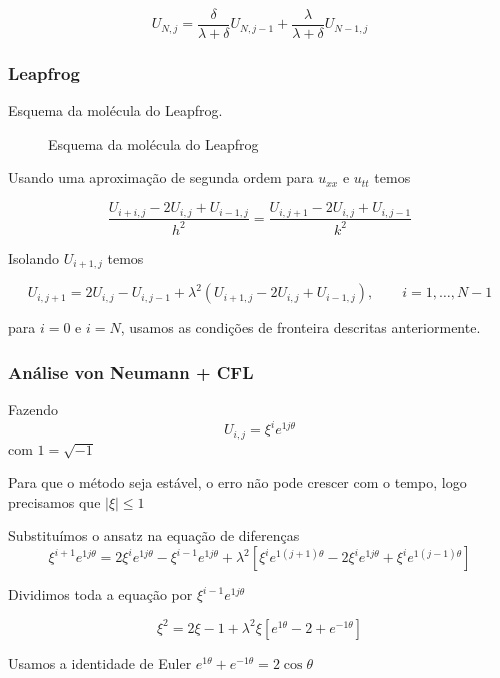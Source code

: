 \documentclass[11pt]{article}
\begin{document}
\[U_{N,j} = \frac{\delta}{\lambda + \delta}U_{N,{j-1}} +\frac{\lambda}{\lambda + \delta} U_{N-1,j}\]

    \hypertarget{leapfrog}{%
\subsubsection{Leapfrog 🐸}\label{leapfrog}}

    Esquema da molécula do Leapfrog.

\begin{figure}
\centering
\caption{Esquema da molécula do Leapfrog}
\end{figure}

    Usando uma aproximação de segunda ordem para \(u_{xx}\) e \(u_{tt}\)
temos

\[
\frac{
  U_{i+i,j} - 2U_{i,j} + U_{i-1,j}
}{h^2} =
\frac{
  U_{i,j+1} - 2U_{i,j} + U_{i,j-1}
}{k^2}
\]

Isolando \(U_{i+1,j}\) temos

\[
U_{i,j+1} = 2U_{i,j} - U_{i,j-1} + \lambda^2\left(U_{i+1,j} - 2U_{i,j} + U_{i-1,j}\right), \qquad i=1,\ldots,N-1
\]

para \(i=0\) e \(i=N\), usamos as condições de fronteira descritas
anteriormente.

    \hypertarget{anuxe1lise-von-neumann-cfl}{%
\subsubsection{Análise von Neumann +
CFL}\label{anuxe1lise-von-neumann-cfl}}

Fazendo \[U_{i,j} = \xi^i e^{\mathcal{1} j \theta}\] com
\(\mathcal{1} = \sqrt{-1}\)

Para que o método seja estável, o erro não pode crescer com o tempo,
logo precisamos que \(|\xi| \le 1\)

Substituímos o ansatz na equação de diferenças
\[\xi^{i+1} e^{\mathcal{1} j \theta} = 2\xi^i e^{\mathcal{1} j \theta} - \xi^{i-1} e^{\mathcal{1} j \theta} + \lambda^2 \left[ \xi^i e^{\mathcal{1} (j+1) \theta} - 2\xi^i e^{\mathcal{1} j \theta} + \xi^i e^{\mathcal{1} (j-1) \theta} \right]\]

Dividimos toda a equação por \(\xi^{i-1} e^{\mathcal{1} j \theta}\)

\[\xi^2 = 2\xi - 1 + \lambda^2 \xi \left[ e^{\mathcal{1} \theta} - 2 + e^{-\mathcal{1} \theta} \right]\]

Usamos a identidade de Euler
\(e^{\mathcal{1} \theta} + e^{-\mathcal{1} \theta} = 2\cos\theta\)
\end{document}
